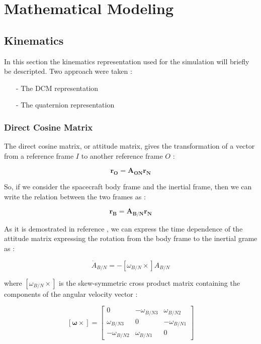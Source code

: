 \documentclass[11pt,a4paper]{report}
\begin{document}
\chapter{Mathematical Modeling}

\section{Kinematics}
In this section the kinematics representation used for the simulation will briefly be descripted. Two approach were taken : 
\begin{itemize}
 \item [-] The DCM representation
 \item [-] The quaternion representation
\end{itemize}

\subsection{Direct Cosine Matrix}
The direct cosine matrix, or attitude matrix, gives the transformation of a vector from a reference frame $I$ to another reference frame $O$ : 

\begin{equation}
 \mathbf{r_{O}} = \mathbf{A_{ON}} \mathbf{r_{N}}
\end{equation}

So, if we consider the spacecraft body frame and the inertial frame, then we can write the relation between the two frames as : 

\begin{equation}
 \mathbf{r_{B}} = \mathbf{A_{B/N}} \mathbf{r_{N}}
\end{equation}

As it is demostrated in reference \cite{Ref:Books:Fundamentals}, we can express the time dependence of the attitude matrix expressing the rotation from the body frame to the inertial grame as : 

\begin{equation}
 \dot{A}_{B/N}= - [\omega_{B/N} \times]A_{B/N} 
\end{equation}

where $[\omega_{B/N} \times]$ is the skew-symmetric cross product matrix containing the components of the angular velocity vector : 

\begin{equation*}
 \mathbf{[\omega \times]} =
                                \begin{bmatrix}
                                    0 & -\omega_{B/N 3} & \omega_{B/N 2} \\
                                    \omega_{B/N 3} & 0 & -\omega_{B/N 1} \\
                                    -\omega_{B/N 2} & \omega_{B/N 1} & 0
                                \end{bmatrix}
\end{equation*}
\end{document}

